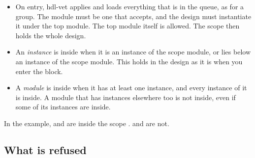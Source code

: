 \begin{itemize}
\item On entry, hdl-vet applies and loads everything that is in the queue, as for a
  group. The module must be one that  accepts, and the design must
  instantiate it under the top module. The top module itself is allowed. The scope
  then holds the whole design.
\item An \emph{instance} is inside when it is an instance of the scope module, or
  lies below an instance of the scope module. This holds in the design as it is when
  you enter the block.
\item A \emph{module} is inside when it has at least one instance, and every
  instance of it is inside. A module that has instances elsewhere too is not
  inside, even if some of its instances are inside.
\end{itemize}

In the example,  and  are inside the scope
.  and  are not.

\subsection*{What is refused}

